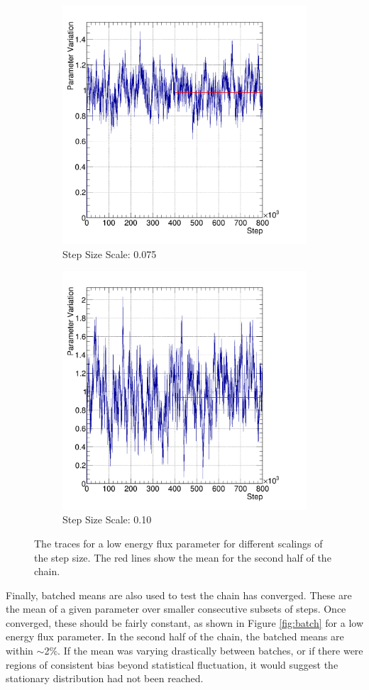 \begin{figure}
\begin{subfigure}{.5\textwidth}
  \includegraphics[width=0.73\linewidth]{figs/trace2}
  \caption{Step Size Scale: 0.075}
  \label{fig:trace2}
\end{subfigure}%
\begin{subfigure}{.5\textwidth}
  \centering
  \includegraphics[width=0.73\linewidth]{figs/trace3}
  \caption{Step Size Scale: 0.10}
  \label{fig:trace3}
\end{subfigure}
\caption{The traces for a low energy flux parameter for different scalings of the step size. The red lines show the mean for the second half of the chain.}
\label{fig:traces}
\end{figure}

Finally, batched means are also used to test the chain has converged. These are the mean of a given parameter over smaller consecutive subsets of steps. Once converged, these should be fairly constant, as shown in Figure \ref{fig:batch} for a low energy flux parameter. In the second half of the chain, the batched means are within $\sim$2$\%$. If the mean was varying drastically between batches, or if there were regions of consistent bias beyond statistical fluctuation, it would suggest the stationary distribution had not been reached.

